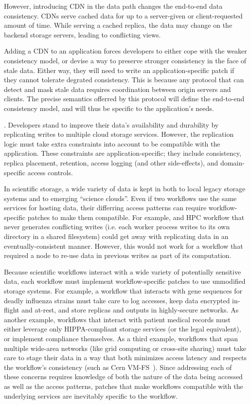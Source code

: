 However, introducing CDN in the data path changes the end-to-end data
consistency.  CDNs serve cached data for up to a
server-given or client-requested amount of time.  While serving a cached
replica, the data may change on the backend storage servers, leading to
conflicting views.

Adding a CDN to an application forces developers to either cope with the
weaker consistency model, or devise a way to preserve stronger consistency
in the face of stale data.  Either way, they will need to write an
application-specific patch if they cannot tolerate degrated consistency.
This is because any protocol that can detect and mask stale data requires
coordination between origin servers and clients.  The precise semantics offerred
by this protocol will define the end-to-end consistency model, and will thus be
specific to the application's needs.

.  Developers stand to
improve their data's availability and durability by replicating 
writes to multiple cloud storage services.  However, the replication
logic must take extra constraints into account to be compatible with the
application.  These constraints are application-specific; they include
consistency, replica placement, retention, access logging (and other side-effects),
and domain-specific access controls.

In scientific storage, a wide variety of data is kept in both to local
legacy storage systems and to emerging ``science clouds''.
Even if two workflows use the same services for hosting data, their differring access patterns
can require workflow-specific patches to make them compatible.
For example, and HPC workflow that never generates conflicting writes (i.e. each
worker process writes to its own directory in a shared filesystem) could get away
with replicating data in an eventually-consistent manner.  However, this would
not work for a workflow that required a node to re-use data in previous writes
as part of its computation.

Because scientific workflows interact with a wide variety of potentially
sensitive data, each workflow must implement workflow-specific patches to use
unmodified storage systems.  For example, a workflow that interacts with gene
sequences for deadly influenza strains must take care to log accesses, keep data
encrypted in-flight and at-rest, and store replicas and outputs in highly-secure
networks.  As another example, workflows that interact with patient medical
records must either leverage only HIPPA-compliant storage services (or the legal
equivalent), or implement compliance themselves.  As a third example, workflows
that span multiple wide-area networks (like grid computing or cross-site
sharing) must take care to stage their data in a way that both minimizes access
latency and respects the workflow's consistency (such as Cern
VM-FS~\cite{cern-vm-fs}).  Since addressing each of these concerns requires
knowledge of both the nature of the data being accessed as well as the access
patterns, patches that make workflows compatible with the underlying services
are inevitably specific to the workflow.

